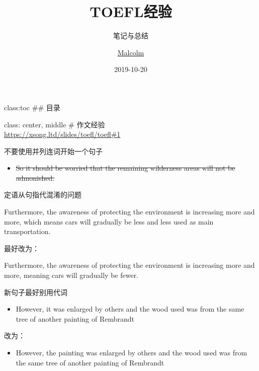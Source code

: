 \documentclass[ignorenonframetext,]{beamer}
\title{TOEFL经验}
\subtitle{笔记与总结}
\author{\href{https://xsong.ltd/}{Malcolm}}
\date{2019-10-20}
\providecommand{\tightlist}{%
  \setlength{\itemsep}{0pt}\setlength{\parskip}{0pt}}
\begin{document}
\frame{\titlepage}

\begin{frame}

class:toc \#\# 目录

\end{frame}

\begin{frame}

class: center, middle \# 作文经验\\
\url{https://xsong.ltd/slides/toefl/toefl\#1}

\begin{block}{不要使用并列连词开始一个句子}

\begin{itemize}
\tightlist
\item
  \sout{So it should be worried that the remaining wilderness areas will
  not be admonished.}
\end{itemize}

\end{block}

\end{frame}

\begin{frame}{定语从句指代混淆的问题}
\protect\hypertarget{ux5b9aux8bedux4eceux53e5ux6307ux4ee3ux6df7ux6dc6ux7684ux95eeux9898}{}

Furthermore, the awareness of protecting the environment is increasing
more and more, which means cars will gradually be less and less used as
main transportation.

最好改为：

Furthermore, the awareness of protecting the environment is increasing
more and more, meaning cars will gradually be fewer.

\end{frame}

\begin{frame}

\begin{block}{新句子最好别用代词}

\begin{itemize}
\tightlist
\item
  However, it was enlarged by others and the wood used was from the same
  tree of another painting of Rembrandt
\end{itemize}

改为：

\begin{itemize}
\tightlist
\item
  However, the painting was enlarged by others and the wood used was
  from the same tree of another painting of Rembrandt
\end{itemize}

\end{block}

\end{frame}
\end{document}
